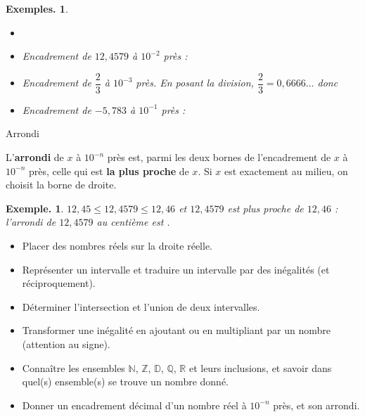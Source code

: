 \documentclass[12pt]{article}
\theoremstyle{break}
\newtheorem*{example}{Exemple.}
\newtheorem*{examples}{Exemples.}
\begin{document}
\begin{examples}
  \begin{itemize}
    \item[]
    \item Encadrement de $12{,}4579$ à $10^{-2}$ près : 
    \item Encadrement de $\dfrac{2}{3}$ à $10^{-3}$ près. En posant la division, $\dfrac{2}{3} = 0{,}6666\ldots$ donc 
    \item Encadrement de $-5{,}783$ à $10^{-1}$ près : 

  \end{itemize}
\end{examples}

\vfill

\begin{definition}{Arrondi}{}
  \begin{multihide}
  L'\textbf{arrondi} de $x$ à $10^{-n}$ près est, parmi les deux bornes de l'encadrement de $x$ à $10^{-n}$ près, celle qui est \textbf{la plus proche} de $x$. Si $x$ est exactement au milieu, on choisit la borne de droite.
  \end{multihide}
\end{definition}

\begin{example}
  $12{,}45 \leq 12{,}4579 \leq 12{,}46$ et $12{,}4579$ est plus proche de $12{,}46$ : l'arrondi de $12{,}4579$ au centième est .
\end{example}

\vspace{2em}

\begin{savoir}{}{}
  \begin{itemize}
    \item Placer des nombres réels sur la droite réelle.
    \item Représenter un intervalle et traduire un intervalle par des inégalités (et réciproquement).
    \item Déterminer l'intersection et l'union de deux intervalles.
    \item Transformer une inégalité en ajoutant ou en multipliant par un nombre (attention au signe).
    \item Connaître les ensembles $\mathbb{N}$, $\mathbb{Z}$, $\mathbb{D}$, $\mathbb{Q}$, $\mathbb{R}$ et leurs inclusions, et savoir dans quel(s) ensemble(s) se trouve un nombre donné.
    \item Donner un encadrement décimal d'un nombre réel à $10^{-n}$ près, et son arrondi.
  \end{itemize}
\end{savoir}

\vfill
\end{document}
